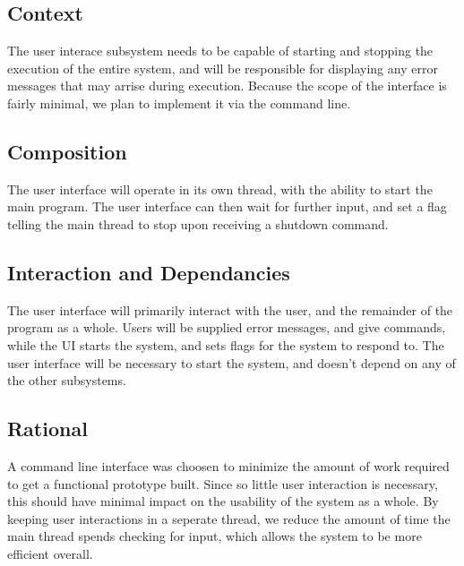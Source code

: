 \subsection{Context}

The user interace subsystem needs to be capable of starting and stopping the execution of the entire system, and will be responsible for displaying any error messages that may arrise during execution.
Because the scope of the interface is fairly minimal, we plan to implement it via the command line.

\subsection{Composition} 

The user interface will operate in its own thread, with the ability to start the main program. 
The user interface can then wait for further input, and set a flag telling the main thread to stop upon receiving a shutdown command.

\subsection{Interaction and Dependancies}

The user interface will primarily interact with the user, and the remainder of the program as a whole.
Users will be supplied error messages, and give commands, while the UI starts the system, and sets flags for the
system to respond to. The user interface will be necessary to start the system, and doesn't
depend on any of the other subsystems. 

\subsection{Rational}

A command line interface was choosen to minimize the amount of work required to get a functional prototype built.
Since so little user interaction is necessary, this should have minimal impact on the usability of the system as a whole.
By keeping user interactions in a seperate thread, we reduce the amount of time 
the main thread spends checking for input, 
which allows the system to be more efficient overall. 
 
